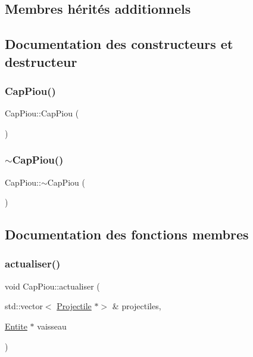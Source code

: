 \subsection*{Membres hérités additionnels}


\subsection{Documentation des constructeurs et destructeur}
\mbox{\label{class_cap_piou_aa2ed61fb1313a447cf8444399001750d}} 
\subsubsection{\texorpdfstring{Cap\+Piou()}{CapPiou()}}
{\footnotesize\ttfamily Cap\+Piou\+::\+Cap\+Piou (\begin{DoxyParamCaption}{ }\end{DoxyParamCaption})}

\mbox{\label{class_cap_piou_a35d7e0b0c14d6a6e01ba0a053a8a60bd}} 
\subsubsection{\texorpdfstring{$\sim$\+Cap\+Piou()}{~CapPiou()}}
{\footnotesize\ttfamily Cap\+Piou\+::$\sim$\+Cap\+Piou (\begin{DoxyParamCaption}{ }\end{DoxyParamCaption})}



\subsection{Documentation des fonctions membres}
\mbox{\label{class_cap_piou_aabdcaa253f10db2bca12e750005485fc}} 
\subsubsection{\texorpdfstring{actualiser()}{actualiser()}}
{\footnotesize\ttfamily void Cap\+Piou\+::actualiser (\begin{DoxyParamCaption}\item[{std\+::vector$<$ \hyperlink{class_projectile}{Projectile} $\ast$$>$ \&}]{projectiles,  }\item[{\hyperlink{class_entite}{Entite} $\ast$}]{vaisseau }\end{DoxyParamCaption})\hspace{0.3cm}{\ttfamily [virtual]}}



